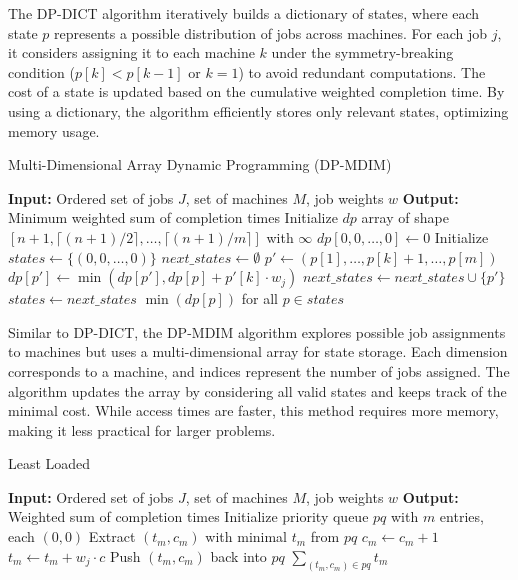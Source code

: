 The DP-DICT algorithm iteratively builds a dictionary of states, where each state $p$ represents a possible distribution of jobs across machines. For each job $j$, it considers assigning it to each machine $k$ under the symmetry-breaking condition ($p[k] < p[k-1]$ or $k = 1$) to avoid redundant computations. The cost of a state is updated based on the cumulative weighted completion time. By using a dictionary, the algorithm efficiently stores only relevant states, optimizing memory usage.

\begin{algorithm}[H]
    \caption{Multi-Dimensional Array Dynamic Programming (DP-MDIM)}\label{alg:dpmdim}
    \begin{algorithmic}[1]
        \State \textbf{Input:} Ordered set of jobs $J$, set of machines $M$, job weights $w$
        \State \textbf{Output:} Minimum weighted sum of completion times
        \State Initialize $dp$ array of shape $[n+1, \lceil (n+1)/2 \rceil, \dots, \lceil (n+1)/m \rceil]$ with $\infty$
        \State $dp[0, 0, \dots, 0] \gets 0$
        \State Initialize $states \gets \{(0, 0, \dots, 0)\}$
            \State $next\_states \gets \emptyset$
                        \State $p' \gets (p[1], \dots, p[k]+1, \dots, p[m])$
                        \State $dp[p'] \gets \min(dp[p'], dp[p] + p'[k] \cdot w_j)$
                        \State $next\_states \gets next\_states \cup \{p'\}$
                    \EndIf
                \EndFor
            \EndFor
            \State $states \gets next\_states$
        \EndFor
        \State \Return $\min(dp[p])$ for all $p \in states$
    \end{algorithmic}
\end{algorithm}

Similar to DP-DICT, the DP-MDIM algorithm explores possible job assignments to machines but uses a multi-dimensional array for state storage. Each dimension corresponds to a machine, and indices represent the number of jobs assigned. The algorithm updates the array by considering all valid states and keeps track of the minimal cost. While access times are faster, this method requires more memory, making it less practical for larger problems.

\begin{algorithm}[H]
    \caption{Least Loaded}\label{alg:leastloaded}
    \begin{algorithmic}[1]
        \State \textbf{Input:} Ordered set of jobs $J$, set of machines $M$, job weights $w$
        \State \textbf{Output:} Weighted sum of completion times
        \State Initialize priority queue $pq$ with $m$ entries, each $(0, 0)$
            \State Extract $(t_m, c_m)$ with minimal $t_m$ from $pq$
            \State $c_m \gets c_m + 1$
            \State $t_m \gets t_m + w_j \cdot c$
            \State Push $(t_m, c_m)$ back into $pq$
        \EndFor
        \State \Return $\sum_{(t_m,c_m) \in pq} t_m$
    \end{algorithmic}
\end{algorithm}

